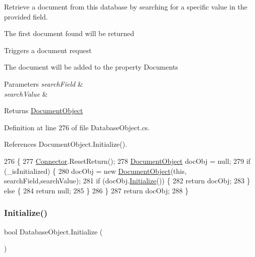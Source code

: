 Retrieve a document from this database by searching for a specific value in the provided field. 

The first document found will be returned

Triggers a document request

The document will be added to the property \textquotesingle{}Documents\textquotesingle{}


\begin{DoxyParams}{Parameters}
{\em search\+Field} & \\
\hline
{\em search\+Value} & \\
\hline
\end{DoxyParams}
\begin{DoxyReturn}{Returns}
\hyperlink{class_document_object}{Document\+Object}
\end{DoxyReturn}


Definition at line 276 of file Database\+Object.\+cs.



References Document\+Object.\+Initialize().


\begin{DoxyCode}
276                                                                                    \{
277         \hyperlink{class_connector}{Connector}.ResetReturn();
278         \hyperlink{class_document_object}{DocumentObject} docObj = null;
279         \textcolor{keywordflow}{if} (\_isInitialized) \{
280             docObj = \textcolor{keyword}{new} \hyperlink{class_document_object}{DocumentObject}(\textcolor{keyword}{this}, searchField,searchValue);
281             \textcolor{keywordflow}{if} (docObj.\hyperlink{class_document_object_af4298d6cfbb9ea60643d9995309b73f1}{Initialize}()) \{
282                 \textcolor{keywordflow}{return} docObj;
283             \} \textcolor{keywordflow}{else} \{
284                 \textcolor{keywordflow}{return} null;
285             \}
286         \}
287         \textcolor{keywordflow}{return} docObj;
288     \}
\end{DoxyCode}
\mbox{\label{class_database_object_a7de43a21bd287deec537cffec343f41d}} 
\subsubsection{\texorpdfstring{Initialize()}{Initialize()}}
{\footnotesize\ttfamily bool Database\+Object.\+Initialize (\begin{DoxyParamCaption}{ }\end{DoxyParamCaption})}



